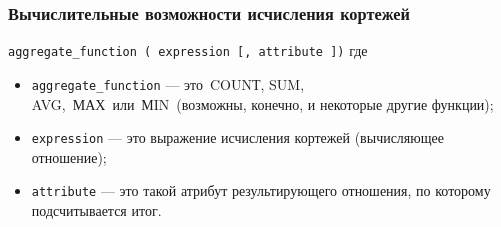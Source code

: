 \subsubsection*{Вычислительные возможности исчисления кортежей}

\texttt{aggregate\_function ( expression [, attribute ])}
где

\begin{itemize}[label*=--]
	\item \texttt{aggregate\_function} --- это COUNТ, SUM, AVG, МАХ или МIN (возможны, конечно, и некоторые другие функции);
	\item \texttt{expression} --- это выражение исчисления кортежей (вычисляющее отношение);
	\item \texttt{attribute} --- это такой атрибут результирующего отношения, по которому подсчитывается итог.
\end{itemize}
